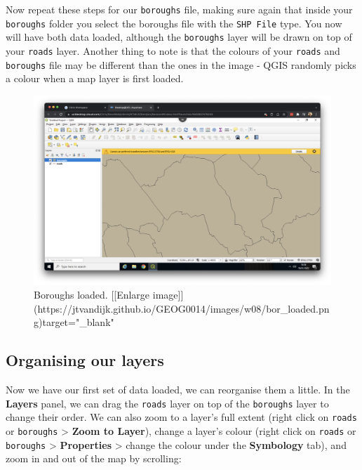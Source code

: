 \documentclass[
]{book}
\begin{document}
Now repeat these steps for our \texttt{boroughs} file, making sure again that inside your \texttt{boroughs} folder you select the boroughs file with the \texttt{SHP\ File} type. You now will have both data loaded, although the \texttt{boroughs} layer will be drawn on top of your \texttt{roads} layer. Another thing to note is that the colours of your \texttt{roads} and \texttt{boroughs} file may be different than the ones in the image - QGIS randomly picks a colour when a map layer is first loaded.

\begin{figure}

{\centering \includegraphics[width=850pt]{images/w08/bor_loaded} 

}

\caption{Boroughs loaded. [[Enlarge image]](https://jtvandijk.github.io/GEOG0014/images/w08/bor_loaded.png){target="_blank"}}\label{fig:bor-loaded}
\end{figure}

\hypertarget{organising-our-layers}{%
\subsection*{Organising our layers}\label{organising-our-layers}}

Now we have our first set of data loaded, we can reorganise them a little. In the \textbf{Layers} panel, we can drag the \texttt{roads} layer on top of the \texttt{boroughs} layer to change their order. We can also zoom to a layer's full extent (right click on \texttt{roads} or \texttt{boroughs} \textgreater{} \textbf{Zoom to Layer}), change a layer's colour (right click on \texttt{roads} or \texttt{boroughs} \textgreater{} \textbf{Properties} \textgreater{} change the colour under the \textbf{Symbology} tab), and zoom in and out of the map by scrolling:
\end{document}
